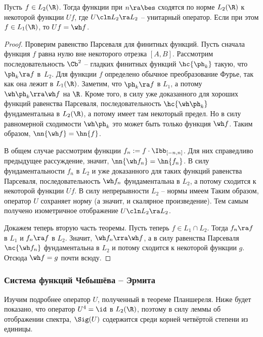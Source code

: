 \documentclass[a4paper]{article}
\def\fsp{\frac{1}{\sqrt{2\pi}}}
\newcommand{\dx}{\,dx}
\begin{document}
\begin{theorem}[Планшереля]
Пусть $f\in L_2(\R)$. Тогда функции
\eqn{\fsp \intl{-n}{n}f(x)e^{-i\la x}\dx}
при $n\ra\bes$ сходятся по норме $L_2(\R)$ к некоторой функции $U f$, где $U\cln L_2\ra L_2$ -- унитарный оператор.
Если при этом $f\in L_1(\R)$, то $Uf = \wh f$.
\end{theorem}
\begin{proof}
Проверим равенство Парсеваля для финитных функций. Пусть сначала функция $f$ равна нулю вне некоторого отрезка $[A,B]$. Рассмотрим последовательность $\Cb^2$ -- гладких
финитных функций $\hc{\ph_k}$ такую, что $\ph_k \ra f$ в~$L_2$. Для функции $f$ определено обычное
преобразование Фурье, так как она лежит в $L_1(\R)$. Заметим, что $\ph_k \ra f$ в $L_1$, а потому $\wh \ph_k \rra \wh f$
на $\R$. Кроме того, в силу уже доказанного для хороших функций равенства Парсеваля, последовательность $\hc{\wh \ph_k}$
фундаментальна в $L_2(\R)$, а потому имеет там некоторый предел. Но в силу  равномерной сходимости $\wh \ph_k$ это
может быть только функция $\wh f$. Таким образом, $\nn{\wh f} = \hn{f}$.

В общем случае рассмотрим функции $f_n := f \cdot \Ibb_{[-n,n]}$. Для них справедливо предыдущее рассуждение, значит,
$\nn{\wh f_n} = \hn{f_n}$. В силу фундаментальности $f_n$ в $L_2$ и уже доказанного для таких функций равенства
Парсеваля, последовательность $\wh f_n$ фундаментальна в $L_2$, а потому сходится к некоторой функции $U f$.
В силу непрерывности $L_2$ -- нормы имеем
Таким образом, оператор $U$ сохраняет норму (а значит, и скалярное произведение).
Тем самым получено изометричное отображение $U\cln L_2\ra L_2$.

Докажем теперь вторую часть теоремы. Пусть теперь $f \in L_1 \cap L_2$. Тогда
$f_n \ra f$ в $L_1$ и $f_n\ra f$ в $L_2$. Значит, $\wh f_n \rra \wh f$, а
в силу равенства Парсеваля $\nc{\wh f_n}$ фундаментальна в $L_2$ и потому сходится к некоторой функции $g$.
Отсюда $\wh f = g$ почти всюду.
\end{proof}

\subsubsection{Система функций Чебышёва -- Эрмита}

Изучим подробнее оператор $U$, полученный в теореме Планшереля.
Ниже будет показано, что оператор $U^4 = \id$ в $L_2(\R)$, поэтому
в силу леммы об отображении спектра, $\Sig(U)$ содержится среди корней четвёртой степени из единицы.
\end{document}

